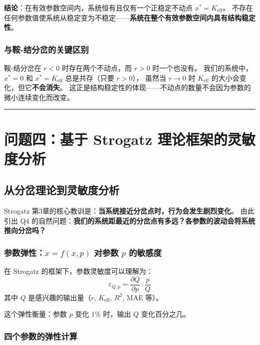\documentclass[12pt,a4paper]{article}
\begin{document}
\textbf{结论}：在有效参数空间内，系统恒有且仅有一个正稳定不动点 $x^* = K_{\text{eff}}$。
不存在任何参数值使系统从稳定变为不稳定——\textbf{系统在整个有效参数空间内具有结构稳定性}。

\subsubsection{与鞍-结分岔的关键区别}
鞍-结分岔在 $r < 0$ 时存在两个不动点，而 $r > 0$ 时一个也没有。
我们的系统中，$x^* = 0$ 和 $x^* = K_{\text{eff}}$ 总是共存（只要 $r > 0$），
虽然当 $r \to 0$ 时 $K_{\text{eff}}$ 的大小会变化，但它\textbf{不会消失}。
这正是结构稳定性的体现——不动点的数量不会因为参数的微小连续变化而改变。

\vspace{12pt}
\hrule
\vspace{12pt}

\section{问题四：基于 Strogatz 理论框架的灵敏度分析}

\subsection{从分岔理论到灵敏度分析}

Strogatz 第3章的核心教训是：\textbf{当系统接近分岔点时，行为会发生剧烈变化}。
由此引出 Q4 的自然问题：\textbf{我们的系统距最近的分岔点有多远？各参数的波动会将系统推向分岔吗？}

\subsubsection{参数弹性：$\dot{x} = f(x, p)$ 对参数 $p$ 的敏感度}

在 Strogatz 的框架下，参数灵敏度可以理解为：
\begin{equation}
\varepsilon_{Q, p} = \frac{\partial Q}{\partial p} \cdot \frac{p}{Q}
\end{equation}
其中 $Q$ 是感兴趣的输出量（$r$, $K_{\text{eff}}$, $R^2$, MAE 等）。

这个弹性衡量：参数 $p$ 变化 $1\%$ 时，输出 $Q$ 变化百分之几。

\subsubsection{四个参数的弹性计算}
\end{document}
